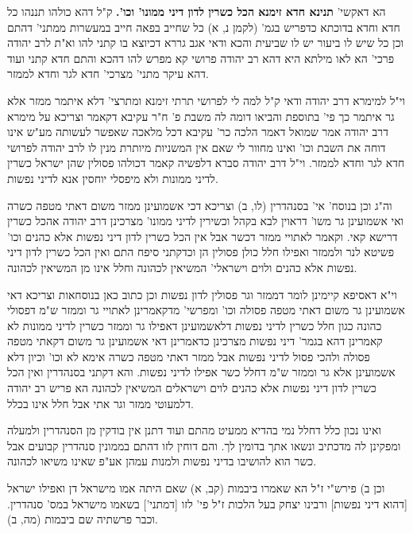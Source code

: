 \documentclass[12pt, openany]{book}
\newcommand{\sethebfont}{
\fontsize{10.5pt}{21.0pt} \selectfont
}
\newcommand{\twocol}[1]{
	{\sethebfont \begin{multicols}{2}
			#1
	\end{multicols}}	
}
\newcommand{\textblock}[1]{
{\sethebfont #1\\}	
}
\begin{document}
\twocol{הא דאקשי' \textbf{תנינא חדא זימנא הכל כשרין לדון דיני ממונו' וכו'.}  ק"ל דהא כולהו תננהו כל חדא וחדא בדוכתא כדפריש בגמ' (לקמן נ, א) כל שחייב בפאה חייב במעשרות ממתני' דהתם וכן כל שיש לו ביעור יש לו שביעית והכא ודאי אגב גררא דכיוצא בו קתני להו וא"ת לרב יהודה פרכי' הא לאו מילתא היא דהא רב יהודה פרושי קא מפרש להו דהכא והתם חדא קתני ועוד דהא עיקר מתני' מצרכי' חדא לגר וחדא לממזר.\par וי"ל למימרא דרב יהודה ודאי ק"ל למה לי לפרושי תרתי זימנא ומתרצי' דלא איתמר ממזר אלא גר איתמר כך פי' בתוספת והביאו דומה לה משבת פ' ח"ר עקיבא דקאמר וצריכא על מימרא דרב יהודה אמר שמואל דאמר הלכה כר' עקיבא דכל מלאכה שאפשר לעשותה מע"ש אינו דוחה את השבת וכו' ואינו מחוור לי שאם אין המשניות מיותרת מנין לו לרב יהודה לפרושי חדא לגר וחדא לממזר. וי"ל דרב יהודה סברא דלפשיה קאמר דכולהו פסולין שהן ישראל כשרין לדיני ממונות ולא מיפסלי יוחסין אנא לדיני נפשות.\par וה"ג וכן בנוסח' אי' בסנהדרין (לו, ב) וצריכא דכי אשמועינן ממזר משום דאתי מטפה כשרה ואי אשמועינן גר משו' דראוין לבא בקהל וכשירין לדיני ממונו' מצרכינן דרב יהודה אהכל כשרין דרישא קאי. וקאמר לאתויי ממזר דכשר אבל אין הכל כשרין לדון דיני נפשות אלא כהנים וכו' פשיטא לנר ולממזר ואפילו חלל כולן פסולין הן וכדקתני סיפח התם ואין הכל כשרין לדון דיני נפשות אלא כהנים ולוים וישראלי' המשיאין לכהונה וחלל אינו מן המשיאין לכהונה.\par וי"א דאסיפא קיימינן לומר דממזר וגר פסולין לדון נפשות וכן כתוב כאן בנוסחאות וצריכא דאי אשמועינן גר משום דאתי מטפה פסולה וכו' ומפרשי' מדקאמרינן לאתויי גר וממזר ש"מ דפסולי כהונה כגון חלל כשרין לדיני נפשות דלאשמועינן דאפילו גר וממזר כשרין לדיני ממונות לא קאמרינן דהא בגמר' דיני נפשות מצרכינן כדאמרינן דאי אשמועינן גר משום דקאתי מטפה פסולה ולהכי פסול לדיני נפשות אבל ממזר דאתי מטפה כשרה אימא לא וכו' וכיון דלא אשמועינן אלא גר וממזר ש"מ דחלל כשר אפילו לדיני נפשות. והא דקתני בסנהדרין ואין הכל כשרין לדון דיני נפשות אלא כהנים לוים וישראלים המשיאין לכהונה הא פריש רב יהודה דלמעוטי ממזר וגר אתי אבל חלל אינו בכלל.\par ואינו נכון כלל דחלל נמי בהדיא ממעיט מהתם ועוד דתנן אין בודקין מן הסנהדרין ולמעלה ומפקינן לה מדכתיב ונשאו אתך בדומין לך. והם דוחין לזו דהתם בממונין סנהדרין קבועים אבל כשר הוא להושיבו בדיני נפשות ולמנות עמהן אע"פ שאינו משיאו לכהונה.\par וכן ב) פירש"י ז"ל הא שאמרו ביבמות (קב, א) שאם היתה אמו מישראל דן ואפילו ישראל [דהוא דיני נפשות] ורבינו יצחק בעל הלכות ז"ל פי' לזו [דמתני'] בשאמו מישראל במס' סנהדרין. וכבר פרשתיה שם ביבמות (מה, ב). 
\par}
\textblock{}{}
\end{document}
